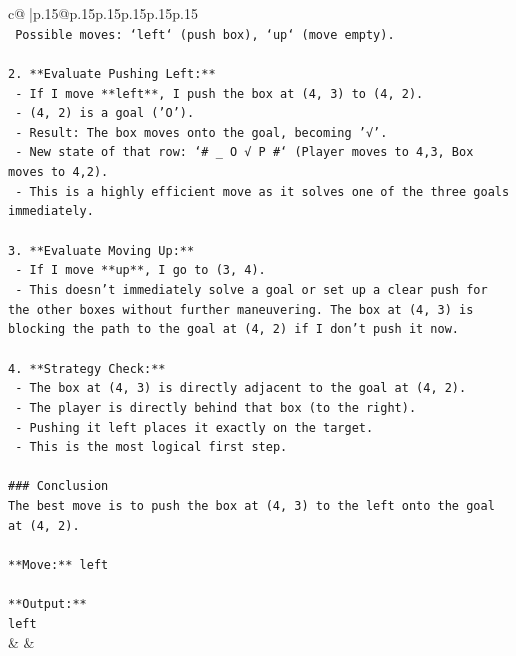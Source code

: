 \documentclass{article}
\begin{document}
{\begin{supertabular}{c@{$\;$}|p{.15\linewidth}@{}p{.15\linewidth}p{.15\linewidth}p{.15\linewidth}p{.15\linewidth}p{.15\linewidth}}
{{{\\ 
\texttt{    Possible moves: `left` (push box), `up` (move empty).} \\
\\ 
\texttt{2.  **Evaluate Pushing Left:**} \\
\texttt{    {-} If I move **left**, I push the box at (4, 3) to (4, 2).} \\
\texttt{    {-} (4, 2) is a goal ('O').} \\
\texttt{    {-} Result: The box moves onto the goal, becoming '√'.} \\
\texttt{    {-} New state of that row: `\# \_ O √ P \#` (Player moves to 4,3, Box moves to 4,2).} \\
\texttt{    {-} This is a highly efficient move as it solves one of the three goals immediately.} \\
\\ 
\texttt{3.  **Evaluate Moving Up:**} \\
\texttt{    {-} If I move **up**, I go to (3, 4).} \\
\texttt{    {-} This doesn't immediately solve a goal or set up a clear push for the other boxes without further maneuvering. The box at (4, 3) is blocking the path to the goal at (4, 2) if I don't push it now.} \\
\\ 
\texttt{4.  **Strategy Check:**} \\
\texttt{    {-} The box at (4, 3) is directly adjacent to the goal at (4, 2).} \\
\texttt{    {-} The player is directly behind that box (to the right).} \\
\texttt{    {-} Pushing it left places it exactly on the target.} \\
\texttt{    {-} This is the most logical first step.} \\
\\ 
\texttt{\#\#\# Conclusion} \\
\texttt{The best move is to push the box at (4, 3) to the left onto the goal at (4, 2).} \\
\\ 
\texttt{**Move:** left} \\
\\ 
\texttt{**Output:**} \\
\texttt{left} \\
            }
        }
    }
    & & \\ \\


\end{supertabular}}
\end{document}
